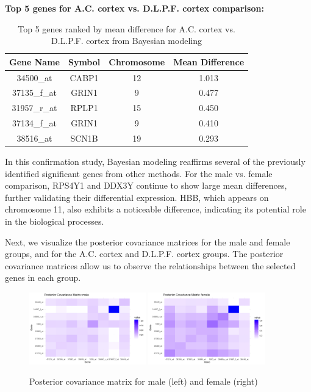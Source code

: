 \documentclass[12pt]{article}
\begin{document}
\textbf{Top 5 genes for A.C. cortex vs. D.L.P.F. cortex comparison:}

\begin{table}[h!]
\centering
\begin{tabular}{|c|c|c|c|}
\hline
\textbf{Gene Name} & \textbf{Symbol} & \textbf{Chromosome} & \textbf{Mean Difference} \\
\hline
34500\_at & CABP1 & 12 & 1.013 \\
37135\_f\_at & GRIN1 & 9 & 0.477 \\
31957\_r\_at & RPLP1 & 15 & 0.450 \\
37134\_f\_at & GRIN1 & 9 & 0.410 \\
38516\_at & SCN1B & 19 & 0.293 \\
\hline
\end{tabular}
\caption{Top 5 genes ranked by mean difference for A.C. cortex vs. D.L.P.F. cortex from Bayesian modeling}
\end{table}

In this confirmation study, Bayesian modeling reaffirms several of the previously identified significant genes from other methods. For the male vs. female comparison, RPS4Y1 and DDX3Y continue to show large mean differences, further validating their differential expression. HBB, which appears on chromosome 11, also exhibits a noticeable difference, indicating its potential role in the biological processes.

Next, we visualize the posterior covariance matrices for the male and female groups, and for the A.C. cortex and D.L.P.F. cortex groups. The posterior covariance matrices allow us to observe the relationships between the selected genes in each group.

\begin{figure}[h!]
    \centering
    \includegraphics[width=0.45\textwidth]{image/pos_cov_male}
    \includegraphics[width=0.45\textwidth]{image/pos_cov_female}
    \caption{Posterior covariance matrix for male (left) and female (right)}
    \label{fig:cov_male_female}
\end{figure}
\FloatBarrier
\end{document}
